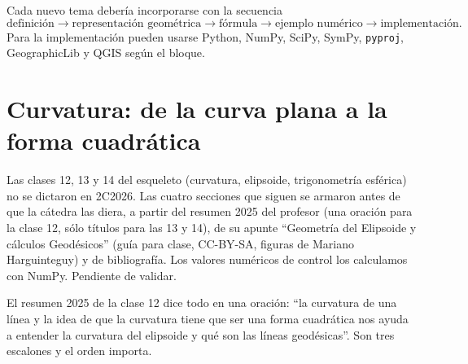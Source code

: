 \begin{idea}
Cada nuevo tema debería incorporarse con la secuencia
\[
\text{definición}\rightarrow
\text{representación geométrica}\rightarrow
\text{fórmula}\rightarrow
\text{ejemplo numérico}\rightarrow
\text{implementación}.
\]
Para la implementación pueden usarse Python, NumPy, SciPy, SymPy, \texttt{pyproj},
GeographicLib y QGIS según el bloque.
\end{idea}


\section{Curvatura: de la curva plana a la forma cuadrática}\label{sec:curvatura}

{\small\vspace{1mm}\par}
{\small\vspace{1mm}\par}


\begin{atencion}[Anticipado]
Las clases 12, 13 y 14 del esqueleto (curvatura, elipsoide, trigonometría esférica) no se
dictaron en 2C2026. Las cuatro secciones que siguen se armaron antes de que la cátedra las
diera, a partir del resumen 2025 del profesor (una oración para la clase 12, sólo títulos
para las 13 y 14), de su apunte ``Geometría del Elipsoide y cálculos Geodésicos'' (guía
para clase, CC-BY-SA, figuras de Mariano Harguinteguy) y de bibliografía. Los valores
numéricos de control los calculamos con NumPy. Pendiente de validar.
\end{atencion}

El resumen 2025 de la clase 12 dice todo en una oración: ``la curvatura de una línea y la
idea de que la curvatura tiene que ser una forma cuadrática nos ayuda a entender la
curvatura del elipsoide y qué son las líneas geodésicas''. Son tres escalones y el orden
importa.

